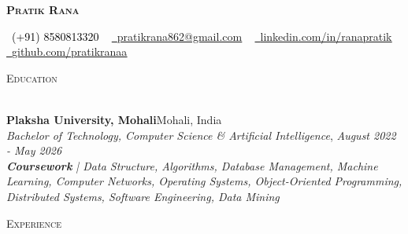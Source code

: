 \documentclass[letterpaper]{article}
\newcommand{\sectionSep} { \vspace{2.5mm} }
\newcommand{\lineunder} {
    \vspace*{-8pt} \\
    \hspace*{-15pt} \hrulefill \\
}
\newcommand{\header} [1] {
    {\hspace*{-18pt}\vspace*{6pt} {
        \fontfamily{qcs}\selectfont \large \scshape #1
    }}
    \vspace*{-6pt} \lineunder
    \vspace{1.1mm}
}
\newcommand{\educationItem}[6]{
    \textbf{#1}\hfill #2\\
    \textit{#3}, \textit{#4} \hfill \textit{#5}\\
    #6
}
\begin{document}

\begin{center}
    {\textbf{\Huge \scshape Pratik Rana}} \\ \vspace{1pt}
    
    \small \textcolor{black}{\raisebox{-0.1\height}\faPhone\
        (+91) 8580813320} ~ \href{mailto:pratikrana862@gmail.com}{{\raisebox{-0.2\height}\faEnvelope\  \underline{pratikrana862@gmail.com}}} ~
    \href{https://www.linkedin.com/in/ranapratik/}{{\raisebox{-0.2\height}\faLinkedinSquare\ \underline{linkedin.com/in/ranapratik}}}  ~
    \href{https://github.com/pratikranaa}{{\raisebox{-0.2\height}\faGithub\ \underline{github.com/pratikranaa}}} 
\end{center}

\vspace{-2mm}

\hypersetup {
    urlcolor     = blue, %
}


\header{Education}

\educationItem{Plaksha University, Mohali}{Mohali, India}{Bachelor of Technology, Computer Science \& Artificial Intelligence}{}{August 2022 - May 2026}{
    \vspace{0.5mm}
    \textit{\textbf{Coursework} | Data Structure, Algorithms, Database Management, Machine Learning, Computer Networks, Operating Systems, Object-Oriented Programming, Distributed Systems, Software Engineering, Data Mining}
}

\sectionSep


\header{Experience}
\end{document}
